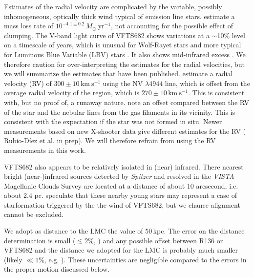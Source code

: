 \documentclass[apjl,twocolumn]{emulateapj}
\newcommand{\kms}{{\,\mathrm{km\ s^{-1}}}}
\begin{document}
Estimates of the radial velocity are complicated by the variable,
possibly inhomogeneous, optically thick wind  typical of emission line
stars. \citet{bestenlehner:11} estimate a mass loss rate of
$10^{-4.1\pm0.2}\,M_\odot \ \mathrm{yr}^{-1}$, not accounting for the
possible effect of clumping.  The V-band light curve of VFTS682  shows
variations at a $\sim$10\% level on a timescale of years, which is
unusual for Wolf-Rayet stars and more typical for Luminous Blue
Variable (LBV) stars \citep{udalski:08, bestenlehner:11}. It also
shows mid-infrared excess \citep{gruendl:09}.  We therefore caution for over-interpreting the estimates for the radial velocities, but we will summarize the estimates that have been published.  \citet{bestenlehner:11}  estimate a radial velocity (RV) of  $300\pm10\kms$ using the  N{\footnotesize V} $\lambda4944$ line, which is offset from the average radial velocity of the region, which is  $270\pm10\kms$. This is consistent with, but no proof of, a runaway nature.  \cite{bressert:12} note an offset compared between the RV of the star and the nebular lines from the gas filaments in its vicinity. This is consistent with the expectation if the star was not formed in situ.  Newer measurements based on new X-shooter data give different estimates for the RV ({\color{blue} Rubio-D{\' i}ez et al. in prep}). We will therefore refrain from using the RV measurements in this work. 

VFTS682 also appears to be relatively isolated in (near) infrared. There nearest bright (near-)infrared sources detected by \emph{Spitzer} \citep{meixner:06} and resolved in the \emph{VISTA} Magellanic Clouds Survey \citep{cioni:11} are located at a distance of about 10 arcsecond, i.e. about 2.4 pc. \cite{walborn:13} speculate that these nearby young stars may represent a case of starformation triggered by the the wind of VFTS682, but we chance alignment cannot be excluded.



We adopt as distance to the LMC the value of $50$\,kpc. The error on the distance determination is small ($\lesssim2\%$, \citealt{pietrzynski:13}) and any possible offset between  R136 or VFTS682  and the distance we adopted for the LMC is probably much smaller (likely $\ll 1\%$, e.g. \citealt{Luks+1992}). These uncertainties are negligible compared to the errors in the proper motion discussed below.  

\end{document}
